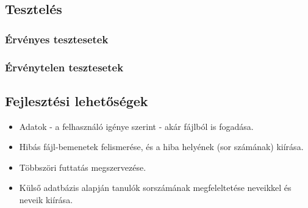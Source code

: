 \documentclass[a4paper]{article}
\begin{document}
    \subsection{Tesztelés}
      \subsubsection{Érvényes tesztesetek}
      \subsubsection{Érvénytelen tesztesetek}
    \subsection{Fejlesztési lehetőségek}
      \begin{itemize}
        \item Adatok - a felhasználó igénye szerint - akár fájlból is fogadása.
        \item Hibás fájl-bemenetek felismerése, és a hiba helyének (sor számának) kiírása.
        \item Többszöri futtatás megszervezése.
        \item Külső adatbázis alapján tanulók sorszámának megfeleltetése neveikkel és neveik kiírása.
      \end{itemize}
\end{document}
